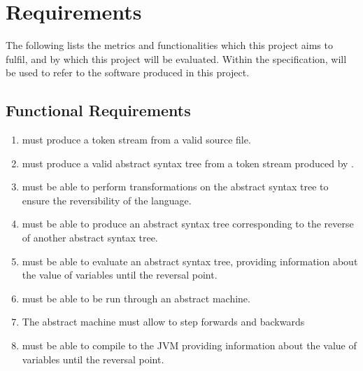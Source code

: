\chapter{Requirements}

The following lists the metrics and functionalities which this project aims to fulfil, and by which this project will be evaluated.
Within the specification, \rimp will be used to refer to the software produced in this project.


\section{Functional Requirements}

\begin{enumerate}
    \item \rimp must produce a token stream from a valid \rimplang source file.
    \item \rimp must produce a valid abstract syntax tree from a token stream produced by \rimp.
    \item \rimp must be able to perform transformations on the abstract syntax tree to ensure the reversibility of the language.
    \item \rimp must be able to produce an abstract syntax tree corresponding to the reverse of another abstract syntax tree.
    \item \rimp must be able to evaluate an abstract syntax tree, providing information about the value of variables until the reversal point.
    \item \rimp must be able to be run through an abstract machine.
    \item The \rimp abstract machine must allow to step forwards and backwards
    \item \rimp must be able to compile to the JVM providing information about the value of variables until the reversal point.
\end{enumerate}

